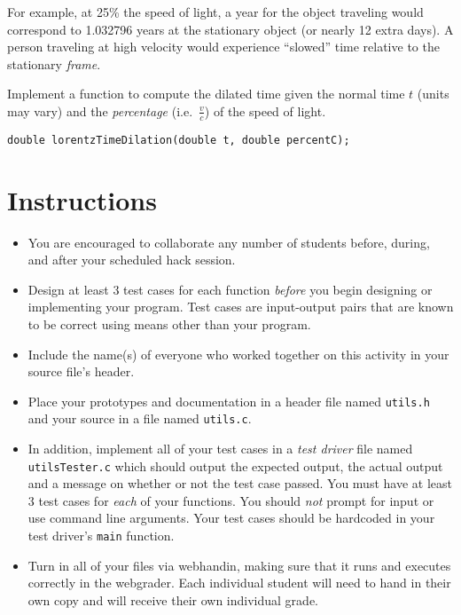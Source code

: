 \documentclass[12pt]{scrartcl}
\begin{document}
\begin{enumerate}
  For example, at 25\% the speed of light, a year for the object 
  traveling would correspond to 1.032796 years at the stationary object 
  (or nearly 12 extra days).   A person traveling at high velocity 
  would experience ``slowed'' time
  relative to the stationary \emph{frame}.  
  
  Implement a function to compute the dilated time given the 
  normal time $t$ (units may vary) and the \emph{percentage}
  (i.e.\ $\frac{v}{c}$) of the speed of light.
\begin{verbatim}
double lorentzTimeDilation(double t, double percentC);
\end{verbatim}

\end{enumerate}  

\section*{Instructions}

\begin{itemize}
  \item You are encouraged to collaborate any number of students 
  before, during, and after your scheduled hack session.  
  \item Design at least 3 test cases for each function
  \emph{before} you begin
  designing or implementing your program.  Test cases are 
  input-output pairs that are known to be correct using means
  other than your program.
  \item Include the name(s) of everyone who worked together on
  this activity in your source file's header.
  \item Place your prototypes and documentation in a header file 
  named \texttt{utils.h} and your source in a file
  named \texttt{utils.c}.
  \item In addition, implement all of your test cases in a
  \emph{test driver} file named \texttt{utilsTester.c}
  which should output the expected output, the actual output and
  a message on whether or not the test case passed.  You must have
  at least 3 test cases for \emph{each} of your functions.
  You should \emph{not} prompt for input or use command line 
  arguments.  Your test cases should be hardcoded in your test 
  driver's \texttt{main} function.  
  \item Turn in all of your files via webhandin, making sure that 
  it runs and executes correctly in the webgrader.  Each individual 
  student will need to hand in their own copy and will receive 
  their own individual grade.
\end{itemize}
  
\end{document}
